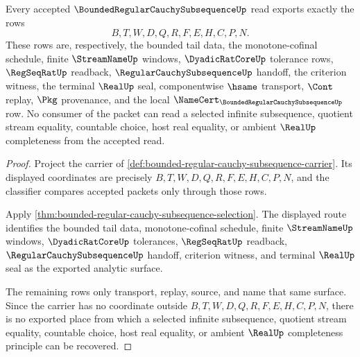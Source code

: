 \begin{theorem}
\label{thm:bounded-regular-cauchy-subsequence-tail-seal}
Every accepted $\BoundedRegularCauchySubsequenceUp$ read exports exactly the rows
$$
B,T,W,D,Q,R,F,E,H,C,P,N.
$$
These rows are, respectively, the bounded tail data, the monotone-cofinal schedule, finite $\StreamNameUp$ windows, $\DyadicRatCoreUp$ tolerance rows, $\RegSeqRatUp$ readback, $\RegularCauchySubsequenceUp$ handoff, the criterion witness, the terminal $\RealUp$ seal, componentwise $\hsame$ transport, $\Cont$ replay, $\Pkg$ provenance, and the local $\NameCert_{\BoundedRegularCauchySubsequenceUp}$ row. No consumer of the packet can read a selected infinite subsequence, quotient stream equality, countable choice, host real equality, or ambient $\RealUp$ completeness from the accepted read.
\end{theorem}
\begin{proof}
Project the carrier of \autoref{def:bounded-regular-cauchy-subsequence-carrier}. Its displayed coordinates are precisely $B,T,W,D,Q,R,F,E,H,C,P,N$, and the classifier compares accepted packets only through those rows.

Apply \autoref{thm:bounded-regular-cauchy-subsequence-selection}. The displayed route identifies the bounded tail data, monotone-cofinal schedule, finite $\StreamNameUp$ windows, $\DyadicRatCoreUp$ tolerances, $\RegSeqRatUp$ readback, $\RegularCauchySubsequenceUp$ handoff, criterion witness, and terminal $\RealUp$ seal as the exported analytic surface.

The remaining rows only transport, replay, source, and name that same surface. Since the carrier has no coordinate outside $B,T,W,D,Q,R,F,E,H,C,P,N$, there is no exported place from which a selected infinite subsequence, quotient stream equality, countable choice, host real equality, or ambient $\RealUp$ completeness principle can be recovered.
\end{proof}


